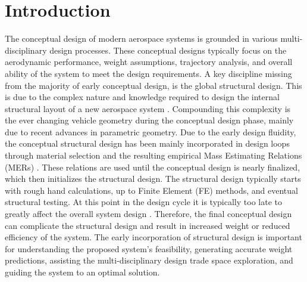 \documentclass[conf]{new-aiaa}
\begin{document}
\section{Introduction}
The conceptual design of modern aerospace systems is grounded in 
various multi-disciplinary design processes. 
These conceptual designs typically focus on the aerodynamic performance, 
weight assumptions, trajectory analysis, and overall ability of the 
system to meet the design requirements. 
A key discipline missing from the majority of early conceptual design, 
is the global structural design. 
This is due to the complex nature and knowledge required to 
design the internal structural layout of a new aerospace system 
\cite{horvath_aircraft_conceptual_structural_design_using_AMMIT,
      alyanak_efficient_supersonic_air_cehicle_structural_modeling,
      sensmeier_automatic_aircraft_structural_topology_generation_for_multidisc}.
Compounding this complexity is the ever changing vehicle 
geometry during the conceptual design phase, 
mainly due to recent advances in parametric geometry. 
Due to the early design fluidity, 
the conceptual structural design has been mainly incorporated in design 
loops through material selection and the resulting empirical 
Mass Estimating Relations (MERs) 
\cite{horvath_aircraft_conceptual_structural_design_using_AMMIT}.
These relations are used until the conceptual design is nearly finalized, 
which then initializes the structural design. 
The structural design typically starts with rough hand calculations, 
up to Finite Element (FE) methods, and eventual structural testing. 
At this point in the design cycle it is typically too late to greatly 
affect the overall system design 
\cite{alyanak_efficient_supersonic_air_cehicle_structural_modeling}.
Therefore, the final conceptual design can complicate the structural 
design and result in increased weight or reduced efficiency of the system. 
The early incorporation of structural design is important for understanding 
the proposed system’s feasibility, generating accurate weight predictions, 
assisting the multi-disciplinary design trade space exploration, 
and guiding the system to an optimal solution.
\end{document}
